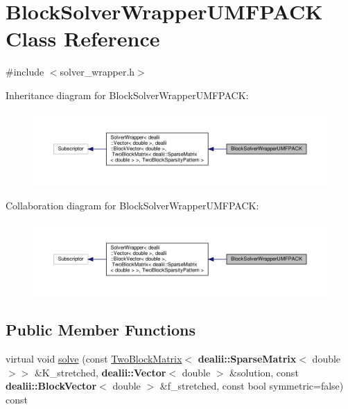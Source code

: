 \hypertarget{class_block_solver_wrapper_u_m_f_p_a_c_k}{}\section{Block\+Solver\+Wrapper\+U\+M\+F\+P\+A\+CK Class Reference}
\label{class_block_solver_wrapper_u_m_f_p_a_c_k}


{\ttfamily \#include $<$solver\+\_\+wrapper.\+h$>$}



Inheritance diagram for Block\+Solver\+Wrapper\+U\+M\+F\+P\+A\+CK\+:\nopagebreak
\begin{figure}[H]
\begin{center}
\leavevmode
\includegraphics[width=350pt]{class_block_solver_wrapper_u_m_f_p_a_c_k__inherit__graph}
\end{center}
\end{figure}


Collaboration diagram for Block\+Solver\+Wrapper\+U\+M\+F\+P\+A\+CK\+:\nopagebreak
\begin{figure}[H]
\begin{center}
\leavevmode
\includegraphics[width=350pt]{class_block_solver_wrapper_u_m_f_p_a_c_k__coll__graph}
\end{center}
\end{figure}
\subsection*{Public Member Functions}
\begin{DoxyCompactItemize}
\item 
virtual void \hyperlink{class_block_solver_wrapper_u_m_f_p_a_c_k_acb9f3b8c9a7996cad23a4d5a663432d7}{solve} (const \hyperlink{class_two_block_matrix}{Two\+Block\+Matrix}$<$ {\bf dealii\+::\+Sparse\+Matrix}$<$ double $>$$>$ \&K\+\_\+stretched, {\bf dealii\+::\+Vector}$<$ double $>$ \&solution, const {\bf dealii\+::\+Block\+Vector}$<$ double $>$ \&f\+\_\+stretched, const bool symmetric=false) const 
\end{DoxyCompactItemize}


